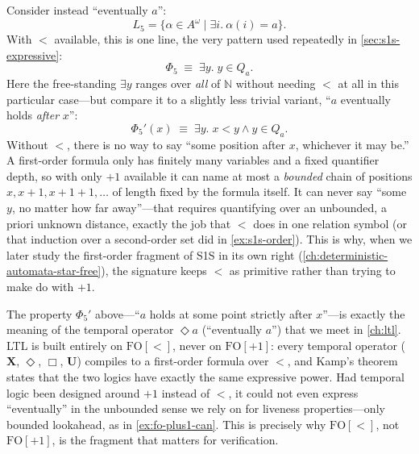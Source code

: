 \begin{example}
\label{ex:fo-plus1-cannot}
Consider instead ``eventually $a$'':
\[
  L_5 = \{\alpha \in A^\omega \mid \exists i.\ \alpha(i) = a\}.
\]
With $<$ available, this is one line, the very pattern used repeatedly
in \cref{sec:s1s-expressive}:
\[
  \Phi_5 \;\equiv\; \exists y.\; y \in Q_a.
\]
Here the free-standing $\exists y$ ranges over \emph{all} of
$\mathbb{N}$ without needing $<$ at all in this particular case---but
compare it to a slightly less trivial variant, ``$a$ eventually holds
\emph{after} $x$'':
\[
  \Phi_5'(x) \;\equiv\; \exists y.\; x < y \land y \in Q_a.
\]
Without $<$, there is no way to say ``some position after $x$,
whichever it may be.'' A first-order formula only has finitely many
variables and a fixed quantifier depth, so with only $+1$ available it
can name at most a \emph{bounded} chain of positions
$x, x+1, x+1+1, \ldots$ of length fixed by the formula itself. It can
never say ``some $y$, no matter how far away''---that requires
quantifying over an unbounded, a priori unknown distance, exactly the
job that $<$ does in one relation symbol (or that induction over a
second-order set did in \cref{ex:s1s-order}). This is why, when we
later study the first-order fragment of S1S in its own right
(\cref{ch:deterministic-automata-star-free}), the signature keeps $<$
as primitive rather than trying to make do with $+1$.
\end{example}

\begin{remark}
The property $\Phi_5'$ above---``$a$ holds at some point strictly
after $x$''---is exactly the meaning of the temporal operator
$\Diamond a$ (``eventually $a$'') that we meet in \cref{ch:ltl}. LTL is
built entirely on $\text{FO}[<]$, never on $\text{FO}[+1]$: every
temporal operator ($\mathbf{X}$, $\Diamond$, $\Box$, $\mathbf{U}$)
compiles to a first-order formula over $<$, and Kamp's theorem states
that the two logics have exactly the same expressive power. Had
temporal logic been designed around $+1$ instead of $<$, it could not
even express ``eventually'' in the unbounded sense we rely on for
liveness properties---only bounded lookahead, as in
\cref{ex:fo-plus1-can}. This is precisely why $\text{FO}[<]$, not
$\text{FO}[+1]$, is the fragment that matters for verification.
\end{remark}

